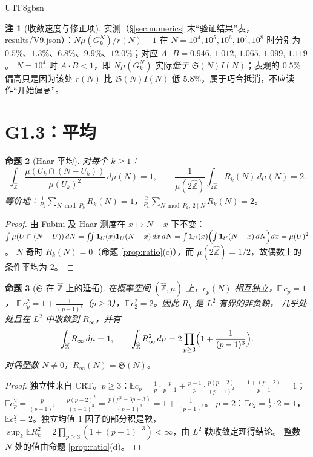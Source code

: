 \documentclass[11pt,a4paper]{article}
\newcommand{\Zhat}{\widehat{\mathbb Z}}
\newcommand{\Haar}{\mu}
\newcommand{\Sing}{\mathfrak S}
\newcommand{\status}[1]{\par\noindent\fbox{\textbf{状态：#1}}\par\smallskip}
\theoremstyle{plain}
\newtheorem{prop}{命题}[section]
\theoremstyle{definition}
\newtheorem{rem}[prop]{注}
\begin{document}
\begin{CJK}{UTF8}{gbsn}
\begin{rem}[收敛速度与修正项]
实测（\S\ref{sec:numerics} 末“验证结果”表，results/V9.json）：$N\Haar(G_k^N)/r(N)-1$ 在 $N=10^4,10^5,10^6,10^7,10^8$ 时分别为
$0.5\%$、$1.3\%$、$6.8\%$、$9.9\%$、$12.0\%$；对应 $A\cdot B=0.946,\,1.012,\,1.065,\,1.099,\,1.119$。
$N=10^4$ 时 $A\cdot B<1$，即 $N\Haar(G_k^N)$ 实际\emph{低于} $\Sing(N)I(N)$；表观的 $0.5\%$ 偏高只是因为该处 $r(N)$ 比 $\Sing(N)I(N)$ 低 $5.8\%$，属于巧合抵消，不应读作“开始偏高”。
\end{rem}

\section{G1.3：平均}\label{sec:avg}

\begin{prop}[Haar 平均]\label{prop:haaravg}
对每个 $k\ge1$：
\[
\int_{\Zhat}\frac{\Haar(U_k\cap(N-U_k))}{\Haar(U_k)^2}\,d\Haar(N)=1,\qquad
\frac1{\Haar(2\Zhat)}\int_{2\Zhat}R_k(N)\,d\Haar(N)=2 .
\]
等价地：$\frac1{P_k}\sum_{N\bmod P_k}R_k(N)=1$，$\frac{2}{P_k}\sum_{N\bmod P_k,\,2\mid N}R_k(N)=2$。
\end{prop}
\status{已证}
\begin{proof}
由 Fubini 及 Haar 测度在 $x\mapsto N-x$ 下不变：
$\int\Haar(U\cap(N-U))\,dN=\iint\mathbf 1_U(x)\mathbf 1_U(N-x)\,dx\,dN=\int\mathbf 1_U(x)\Bigl(\int\mathbf 1_U(N-x)\,dN\Bigr)dx=\Haar(U)^2$。
$N$ 奇时 $R_k(N)=0$（命题 \ref{prop:ratio}(c)），而 $\Haar(2\Zhat)=1/2$，故偶数上的条件平均为 $2$。
\end{proof}

\begin{prop}[$\Sing$ 在 $\Zhat$ 上的延拓]\label{prop:martingale}
在概率空间 $(\Zhat,\Haar)$ 上，$c_p(N)$ 相互独立，$\mathbb E\,c_p=1$，
$\mathbb E\,c_p^2=1+\frac1{(p-1)^3}$（$p\ge3$），$\mathbb E\,c_2^2=2$。因此 $R_k$ 是 $L^2$ 有界的非负鞅，
几乎处处且在 $L^2$ 中收敛到 $R_\infty$，并有
\[
\int_{\Zhat}R_\infty\,d\Haar=1,\qquad \int_{\Zhat}R_\infty^2\,d\Haar=2\prod_{p\ge3}\Bigl(1+\frac1{(p-1)^3}\Bigr).
\]
对偶整数 $N\ne0$，$R_\infty(N)=\Sing(N)$。
\end{prop}
\status{已证}
\begin{proof}
独立性来自 CRT。$p\ge3$：$\mathbb E c_p=\frac1p\cdot\frac p{p-1}+\frac{p-1}p\cdot\frac{p(p-2)}{(p-1)^2}=\frac{1+(p-2)}{p-1}=1$；
$\mathbb E c_p^2=\frac{p}{(p-1)^2}+\frac{p(p-2)^2}{(p-1)^3}=\frac{p(p^2-3p+3)}{(p-1)^3}=1+\frac1{(p-1)^3}$。
$p=2$：$\mathbb E c_2=\frac12\cdot2=1$，$\mathbb E c_2^2=2$。独立均值 $1$ 因子的部分积是鞅，
$\sup_k\mathbb E R_k^2=2\prod_{p\ge3}(1+(p-1)^{-3})<\infty$，由 $L^2$ 鞅收敛定理得结论。
整数 $N$ 处的值由命题 \ref{prop:ratio}(d)。
\end{proof}


\end{CJK}
\end{document}
